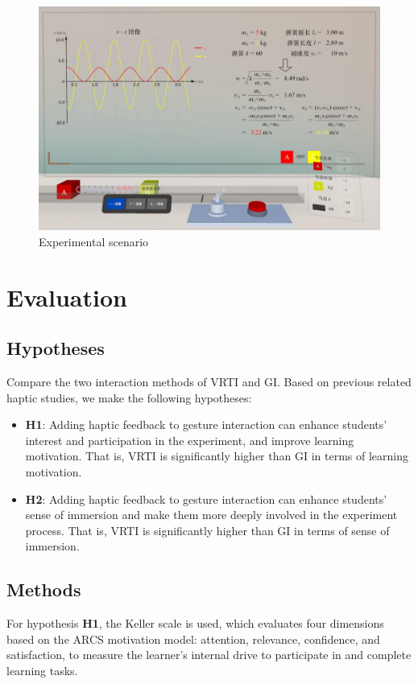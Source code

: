 \documentclass[runningheads]{llncs}
\begin{document}
\begin{figure}[t]
  \centering
  \includegraphics[width=1\textwidth]{image/experiment-scenario.pdf}
  \caption{Experimental scenario}
  \label{fig:experiment-scenario}
\end{figure}

\section{Evaluation}
\subsection{Hypotheses}
Compare the two interaction methods of VRTI and GI. Based on previous related haptic studies, we make the following hypotheses:

\begin{itemize}[label=\(\bullet\)]
  \item \textbf{H1}: Adding haptic feedback to gesture interaction can enhance students' interest and participation in the experiment, and improve learning motivation. That is, VRTI is significantly higher than GI in terms of learning motivation.
  \item \textbf{H2}: Adding haptic feedback to gesture interaction can enhance students' sense of immersion and make them more deeply involved in the experiment process. That is, VRTI is significantly higher than GI in terms of sense of immersion.
\end{itemize}

\subsection{Methods}
For hypothesis \textbf{H1}, the Keller scale \cite{keller1983motivational} is used, which evaluates four dimensions based on the ARCS motivation model: attention, relevance, confidence, and satisfaction, to measure the learner's internal drive to participate in and complete learning tasks.
\end{document}
